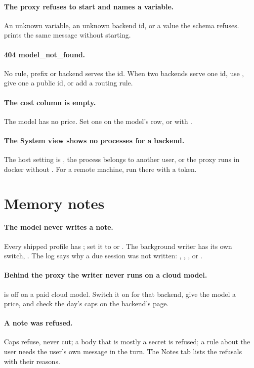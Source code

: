 \paragraph{The proxy refuses to start and names a variable.} An unknown  variable, an unknown backend id, or a value the schema refuses.  prints the same message without starting.

\paragraph{404 model\_not\_found.} No rule, prefix or backend serves the id. When two backends serve one id, use , give one a public id, or add a routing rule.

\paragraph{The cost column is empty.} The model has no price. Set one on the model's row, or with .

\paragraph{The System view shows no processes for a backend.} The host setting is , the process belongs to another user, or the proxy runs in docker without . For a remote machine, run  there with a token.

\section{Memory notes}

\paragraph{The model never writes a note.} Every shipped profile has ; set it to  or . The background writer has its own switch, . The log says why a due session was not written: , , ,  or .

\paragraph{Behind the proxy the writer never runs on a cloud model.}  is off on a paid cloud model. Switch it on for that backend, give the model a price, and check the day's caps on the backend's page.

\paragraph{A note was refused.} Caps refuse, never cut; a body that is mostly a secret is refused; a rule about the user needs the user's own message in the turn. The Notes tab lists the refusals with their reasons.

